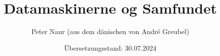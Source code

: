 \documentclass{article}
\title{Datamaskinerne og Samfundet}
\author{Peter Naur (aus dem dänischen von André Greubel)}
\date{Übersetzungsstand: 30.07.2024}
\begin{document}
\maketitle



\pagebreak









\end{document}
